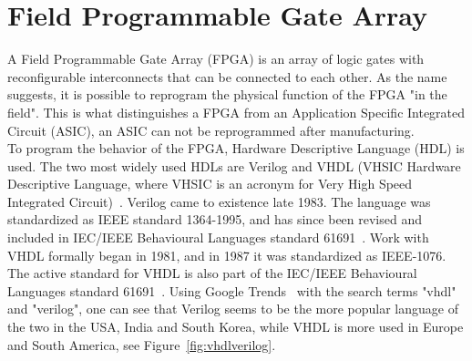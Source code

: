 
\section{Field Programmable Gate Array}
A Field Programmable Gate Array (FPGA) is an array of logic gates with reconfigurable interconnects that can be connected to each other. As the name suggests, it is possible to reprogram the physical function of the FPGA "in the field". This is what distinguishes a FPGA from an Application Specific Integrated Circuit (ASIC), an ASIC can not be reprogrammed after manufacturing.\\ %

To program the behavior of the FPGA, Hardware Descriptive Language (HDL) is used. The two most widely used HDLs are Verilog and VHDL (VHSIC Hardware Descriptive Language, where VHSIC is an acronym for Very High Speed Integrated Circuit)~\cite{}. Verilog came to existence late 1983. The language was standardized as IEEE standard 1364-1995, and has since been revised and included in IEC/IEEE Behavioural Languages standard 61691~\cite{IEEEVerilog}. Work with VHDL formally began in 1981, and in 1987 it was standardized as IEEE-1076. The active standard for VHDL is also part of the IEC/IEEE Behavioural Languages standard 61691~\cite{IEEEVHDL}. Using Google Trends~\cite{googletrends} with the search terms "vhdl" and "verilog", one can see that Verilog seems to be the more popular language of the two in the USA, India and South Korea, while VHDL is more used in Europe and South America, see Figure~\ref{fig:vhdlverilog}.

